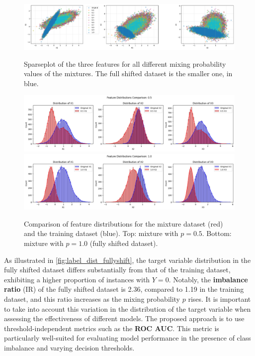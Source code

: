 \begin{figure}
    \centering
    \includegraphics[width=1.0\textwidth]{assets/sparse_mix_shift.png}
    \caption{Sparseplot of the three features for all different mixing probability values of the mixtures. The full shifted dataset is the smaller one, in blue.}
    \label{fig:sparse_mix_shift}
    \vspace{1.5cm}
    \includegraphics[width=1.0\textwidth]{assets/dist_mix05.png}
    \includegraphics[width=1.0\textwidth]{assets/dist_fullshift.png}
    \caption{Comparison of feature distributions for the mixture dataset (red) and the training dataset (blue). Top: mixture with $p=0.5$. Bottom: mixture with $p=1.0$ (fully shifted dataset).}
    \label{fig:dist_mix05}
\end{figure}

As illustrated in \cref{fig:label_dist_fullyshift}, the target variable distribution in the fully shifted dataset differs substantially from that of the training dataset, exhibiting a higher proportion of instances with $Y=0$. Notably, the \textbf{imbalance ratio} (IR) of the fully shifted dataset is 2.36, compared to 1.19 in the training dataset, and this ratio increases as the mixing probability $p$ rises. It is important to take into account this variation in the distribution of the target variable when assessing the effectiveness of different models. The proposed approach is to use threshold-independent metrics such as the \textbf{ROC AUC}. This metric is particularly well-suited for evaluating model performance in the presence of class imbalance and varying decision thresholds.
